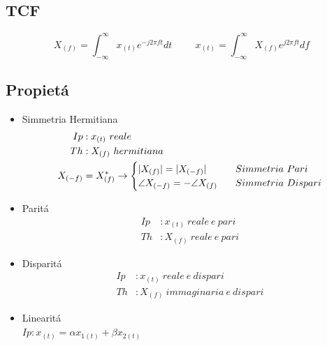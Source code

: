     \subsection{TCF}
        \[X_{(f)} = \int_{-\infty}^{\infty} x_{(t)} e^{-j2\pi ft} dt\hspace{1cm} x_{(t)} = \int_{-\infty}^{\infty} X_{(f)} e^{j2\pi ft} df\]
        \subsection{Propietá}
            \begin{itemize}
                \item {Simmetria Hermitiana
                    \begin{align}
                        Ip&: x_{(t)}\ reale \nonumber \\
                        Th&: X_{(f)}\ hermitiana \nonumber \\ 
                        X_{(-f)} &= X_{(f)}^{*} \rightarrow
                            \begin{cases}
                                |X_{(f)}| = |X_{(-f)}| \hspace{0.3cm} & Simmetria\ Pari \\
                                \angle X_{(-f)} = -\angle X_{(f)}\hspace{0.3cm} & Simmetria\ Dispari
                            \end{cases} \nonumber
                    \end{align}
                }
                \item {Paritá
                    \begin{align}
                        Ip&: x_{(t)}\ reale\ e\ pari  \nonumber \\
                        Th&: X_{(f)}\ reale\ e\ pari \nonumber  
                    \end{align}
                    }
                \item {Disparitá
                    \begin{align}
                        Ip&: x_{(t)}\ reale\ e\ dispari  \nonumber \\
                        Th&: X_{(f)}\ immaginaria\ e\ dispari \nonumber 
                    \end{align}
                }
                \item{Linearitá\\
                    $Ip: x_{(t)} = \alpha x_{1(t)} + \beta x_{2(t)}$\\        
}
\end{itemize}
